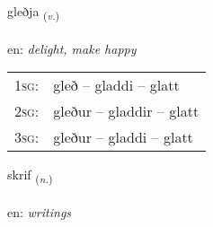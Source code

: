 \documentclass[frontgrid, backgrid]{flacards}\usepackage[]{graphicx}\usepackage[]{color}
\begin{document}
\renewcommand{\blhead}{\vskip5pt {\small\bfseries\footnotesize Sagnorð | Verb }}
\renewcommand{\bcfoot}{\vskip5pt \hspace{2pt}{\small\bfseries\footnotesize 2K}}


{gleðja \small{\textsubscript{(\textit{v.})}} \\[1ex] %
\textphonetic{[klɛðja]} \\
en: \emph{delight, make happy} \\  [2ex]
\renewcommand*{\arraystretch}{0.8}
\begin{tabular}{p{1cm}l}
\textsc{1sg}: & gleð -- gladdi -- glatt \\ 
\textsc{2sg}: & gleður -- gladdir -- glatt \\ 
\textsc{3sg}: & gleður -- gladdi -- glatt \\ 
\end{tabular}
}

\renewcommand{\flhead}{\vskip5pt \fboxsep=0pt {\small\bfseries\footnotesize Nafnorð | Noun}}
\renewcommand{\fcfoot}{\vskip5pt \fboxsep=0pt \hspace{2pt}{\small\bfseries\footnotesize 2K}}

\renewcommand{\blhead}{\vskip5pt {\small\bfseries\footnotesize Nafnorð | Noun }}
\renewcommand{\bcfoot}{\vskip5pt \hspace{2pt}{\small\bfseries\footnotesize 2K}}


{skrif \small{\textsubscript{(\textit{n.})}} \\[1ex] %
\textphonetic{[skrɪːv]} \\
en: \emph{writings} \\  [2ex]
\renewcommand*{\arraystretch}{0.8}
}

\renewcommand{\flhead}{\vskip5pt \fboxsep=0pt {\small\bfseries\footnotesize Sagnorð | Verb}}
\renewcommand{\fcfoot}{\vskip5pt \fboxsep=0pt \hspace{2pt}{\small\bfseries\footnotesize 2K}}
\end{document}
